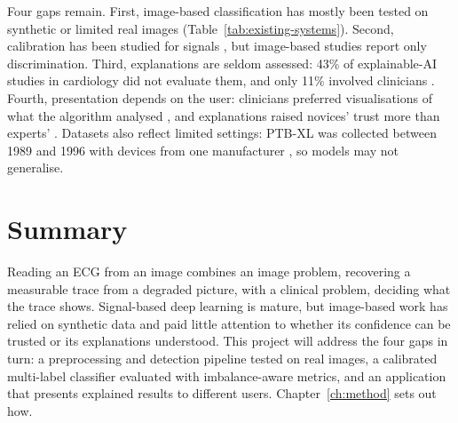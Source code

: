 Four gaps remain. First, image-based classification has mostly been tested on synthetic or limited real images (Table~\ref{tab:existing-systems}). Second, calibration has been studied for signals \cite{chen_quantifying_2022}, but image-based studies report only discrimination. Third, explanations are seldom assessed: 43\% of explainable-AI studies in cardiology did not evaluate them, and only 11\% involved clinicians \cite{salih_review_2024}. Fourth, presentation depends on the user: clinicians preferred visualisations of what the algorithm analysed \cite{hughes-noehrer_contrasting_2024}, and explanations raised novices' trust more than experts' \cite{cabitza_painting_2023}. Datasets also reflect limited settings: PTB-XL was collected between 1989 and 1996 with devices from one manufacturer \cite{wagner_ptbxl_2020}, so models may not generalise.

\section{Summary}
\label{sec:lit-summary}

Reading an ECG from an image combines an image problem, recovering a measurable trace from a degraded picture, with a clinical problem, deciding what the trace shows. Signal-based deep learning is mature, but image-based work has relied on synthetic data and paid little attention to whether its confidence can be trusted or its explanations understood. This project will address the four gaps in turn: a preprocessing and detection pipeline tested on real images, a calibrated multi-label classifier evaluated with imbalance-aware metrics, and an application that presents explained results to different users. Chapter~\ref{ch:method} sets out how.